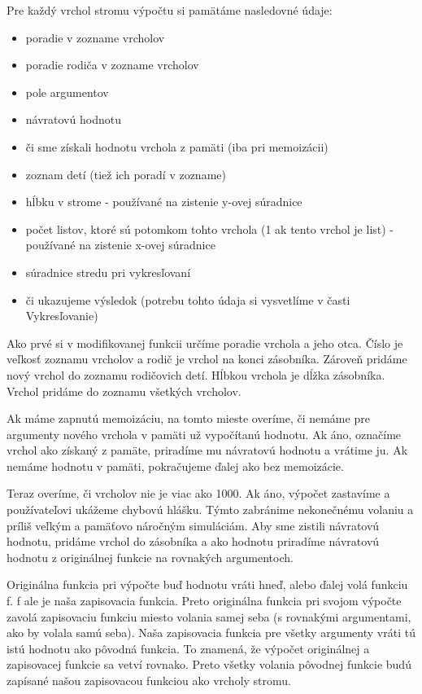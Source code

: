Pre každý vrchol stromu výpočtu si pamätáme nasledovné údaje:

\begin{itemize}
  \item poradie v zozname vrcholov
  \item poradie rodiča v zozname vrcholov
  \item pole argumentov
  \item návratovú hodnotu
  \item či sme získali hodnotu vrchola z pamäti (iba pri memoizácii)
  \item zoznam detí (tiež ich poradí v zozname)
  \item hĺbku v strome - používané na zistenie y-ovej súradnice
  \item počet listov, ktoré sú potomkom tohto vrchola (1 ak tento vrchol je list) - používané na zistenie
    x-ovej súradnice
  \item súradnice stredu pri vykresľovaní
  \item či ukazujeme výsledok (potrebu tohto údaja si vysvetlíme v časti Vykresľovanie)
\end{itemize}

Ako prvé si v modifikovanej funkcii určíme poradie vrchola a jeho otca. Číslo
je veľkosť zoznamu vrcholov a rodič je vrchol na konci zásobníka. Zároveň pridáme
nový vrchol do zoznamu rodičovich detí. Hĺbkou vrchola je dĺžka zásobníka.
Vrchol pridáme do zoznamu všetkých vrcholov.

Ak máme zapnutú memoizáciu, na tomto mieste overíme, či nemáme pre argumenty nového
vrchola v pamäti už vypočítanú hodnotu. Ak áno, označíme vrchol ako získaný z pamäte, priradíme mu
návratovú hodnotu a vrátime ju. Ak nemáme hodnotu v pamäti, pokračujeme ďalej ako
bez memoizácie.

Teraz overíme, či vrcholov nie je viac ako 1000. Ak áno, výpočet zastavíme
a používateľovi ukážeme chybovú hlášku. Týmto zabránime nekonečnému volaniu a príliš
veľkým a pamäťovo náročným simuláciám.
\newline
\newline
Aby sme zistili návratovú hodnotu, pridáme vrchol do zásobníka a ako
hodnotu priradíme návratovú hodnotu z originálnej funkcie na rovnakých argumentoch.

Originálna funkcia pri výpočte
buď hodnotu vráti hneď, alebo ďalej volá funkciu f. f ale je naša zapisovacia
funkcia. Preto originálna funkcia pri svojom výpočte zavolá zapisovaciu funkciu
miesto volania samej seba (s rovnakými argumentami, ako by volala samú seba).
Naša zapisovacia funkcia pre všetky argumenty vráti tú istú hodnotu ako pôvodná funkcia.
To znamená, že výpočet originálnej a zapisovacej funkcie sa vetví rovnako.
Preto všetky volania pôvodnej funkcie budú zapísané našou zapisovacou funkciou ako
vrcholy stromu.

